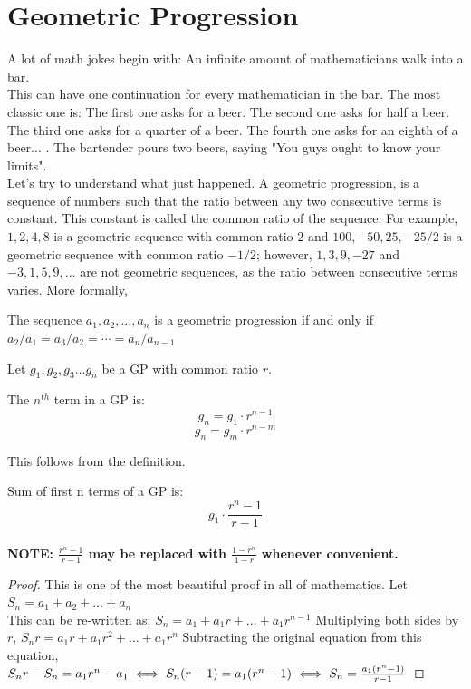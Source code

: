 \section{Geometric Progression}
A lot of math jokes begin with: An infinite amount of mathematicians walk into a bar.\\
This can have one continuation for every mathematician in the bar. The most classic one is: The first one asks for a beer. The second one asks for half a beer. The third one asks for a quarter of a beer. The fourth one asks for an eighth of a beer... . The bartender pours two beers, saying "You guys ought to know your limits".\\
Let's try to understand what just happened. A geometric progression, is a sequence of numbers such that the ratio between any two consecutive terms is constant. This constant is called the common ratio of the sequence. For example, $1, 2, 4, 8$ is a geometric sequence with common ratio $2$ and $100, -50, 25, -25/2$ is a geometric sequence with common ratio $-1/2$; however, $1, 3, 9, -27$ and $-3, 1, 5, 9, \ldots$ are not geometric sequences, as the ratio between consecutive terms varies.
More formally, \\
\begin{definition}
    The sequence $a_1, a_2, \ldots , a_n$ is a geometric progression if and only if $a_2 / a_1 = a_3 / a_2 = \cdots = a_n / a_{n-1}$
\end{definition}
Let $g_1, g_2, g_3 \dots g_n$ be a GP with common ratio $r$.\\
\begin{theorem}
    The $n^{th}$ term in a GP is:
    \[g_n=g_1\cdot r^{n-1} \]
    \[g_n=g_m\cdot r^{n-m} \]    
\end{theorem}
This follows from the definition.
\begin{theorem}
    Sum of first n terms of a GP is:\\
    \[g_1\cdot \frac{r^n-1}{r-1}\]\\
    \textbf{NOTE: $\frac{r^n-1}{r-1}$ may be replaced with $\frac{1-r^n}{1-r}$ whenever convenient.}
\end{theorem}
\begin{proof}
This is one of the most beautiful proof in all of mathematics.
Let $S_n = a_1 + a_2 + \dots + a_n$\\
This can be re-written as:
$S_n = a_1 + a_1r + \dots + a_1r^{n-1}$
Multiplying both sides by $r$,
$S_nr = a_1r + a_1r^2 + \dots + a_1r^n$
Subtracting the original equation from this equation,\\
$S_nr - S_n = a_1r^n - a_1\\
\iff S_n(r-1)=a_1(r^n-1)\\
\iff S_n=\frac{a_1(r^n-1)}{r-1}$
\end{proof}
